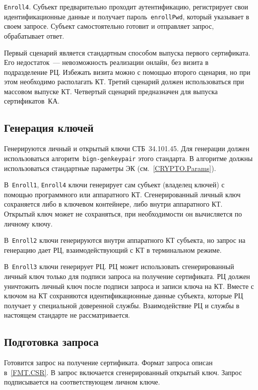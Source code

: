 \texttt{Enroll4}.
Субъект предварительно проходит аутентификацию, регистрирует свои 
идентификационные данные и получает пароль~\texttt{enrollPwd}, 
который указывает в своем запросе. Субъект самостоятельно готовит и 
отправляет запрос, обрабатывает ответ.

Первый сценарий является стандартным способом выпуска первого сертификата. 
Его недостаток~--- невозможность реализации онлайн, 
без визита в подразделение РЦ. Избежать визита можно с помощью второго 
сценария, но при этом необходимо располагать КТ. 
%
Третий сценарий должен использоваться при массовом выпуске КТ.
%
Четвертый сценарий предназначен для выпуска сертификатов~КА.

\subsection{Генерация ключей}\label{PROCESSES.Enroll.Gen}

Генерируются личный и открытый ключи СТБ~34.101.45.
Для генерации должен использоваться алгоритм~\texttt{bign-genkeypair}
этого стандарта. В алгоритме должны использоваться 
стандартные параметры ЭК (см.~\ref{CRYPTO.Params}).

В~\texttt{Enroll1}, \texttt{Enroll4} ключи генерирует сам субъект 
(владелец ключей) с помощью программного или аппаратного КТ. 
Сгенерированный личный ключ сохраняется либо в ключевом контейнере, либо 
внутри аппаратного КТ. Открытый ключ может не сохраняться, при необходимости он 
вычисляется по личному ключу.


В~\texttt{Enroll2} ключи генерируются внутри аппаратного КТ субъекта,
но запрос на генерацию дает РЦ, взаимодействующий с КТ в терминальном 
режиме. 

В~\texttt{Enroll3} ключи генерирует РЦ. 
РЦ может использовать сгенерированный личный ключ только для 
подписи запроса на получение сертификата. РЦ должен уничтожить личный ключ 
после подписи запроса и записи ключа на КТ.
%
Вместе с ключом на КТ сохраняются идентификационные данные субъекта,
которые РЦ получает у специальной доверенной службы. 
Взаимодействие РЦ и службы в настоящем стандарте не рассматривается.

\subsection{Подготовка запроса}\label{PROCESSES.Enroll.CSR}

Готовится запрос на получение сертификата. Формат запроса описан
в~\ref{FMT.CSR}. В запрос включается сгенерированный открытый ключ. 
Запрос подписывается на соответствующем личном ключе.

